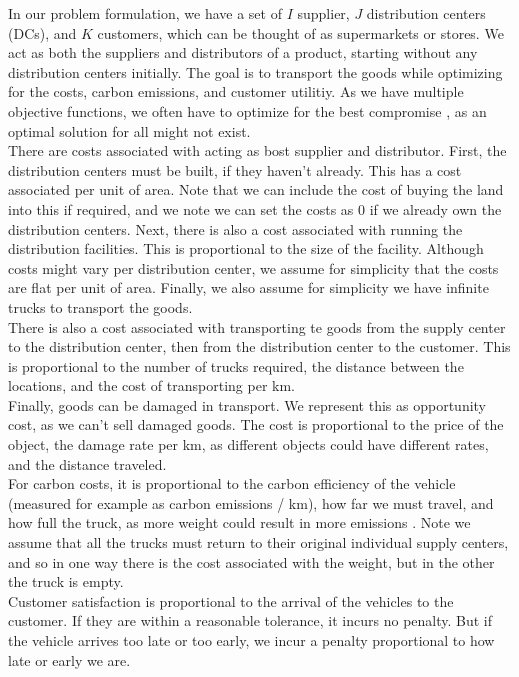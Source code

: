\documentclass[conference]{IEEEtran}
\begin{document}
In our problem formulation, we have a set of $I$ supplier, $J$ distribution centers (DCs), and $K$ customers, which can be thought of as supermarkets or stores.
We act as both the suppliers and distributors of a product, starting without any distribution centers initially. The goal is to transport the goods while optimizing for the costs, carbon emissions, and customer utilitiy. As we have multiple objective functions, we often have to optimize for the best compromise  \cite{benayounLinearProgrammingMultiple1971}, as an optimal solution for all might not exist. \\
There are costs associated with acting as bost supplier and distributor. First, the distribution 
centers must be built, if they haven't already. This has a cost associated per unit of area. Note that we can include the cost of buying the land into this if required, and we note we can set the costs as 0 if we already own the distribution centers.
Next, there is also a cost associated with running the distribution facilities. This is proportional to the size of the facility. Although costs might vary per distribution center, we assume for simplicity that the costs are flat per unit of area. Finally, we also assume for simplicity we have infinite trucks to transport the goods. \\
There is also a cost associated with transporting te goods from the supply center to the distribution center, then from the distribution center to the customer. This is proportional to the number of trucks required, the distance between the locations, and the cost of transporting per km.\\
Finally, goods can be damaged in transport. We represent this as opportunity cost, as we can't sell damaged goods. The cost is proportional to the price of the object, the damage rate per km, as different objects could have different rates, and the distance traveled.\\
For carbon costs, it is proportional to the carbon efficiency of the vehicle (measured for example as carbon emissions / km), how far we must travel, and how full the truck, as more weight could result in more emissions \cite{du_plessis_calculating_2023}. Note we assume that all the trucks must return to their original individual supply centers, and so in one way there is the cost associated with the weight, but in the other the truck is empty.\\
Customer satisfaction is proportional to the arrival of the vehicles to the customer. If they are within a reasonable tolerance, it incurs no penalty. But if the vehicle arrives too late or too early, we incur a penalty proportional to how late or early we are.
\end{document}
